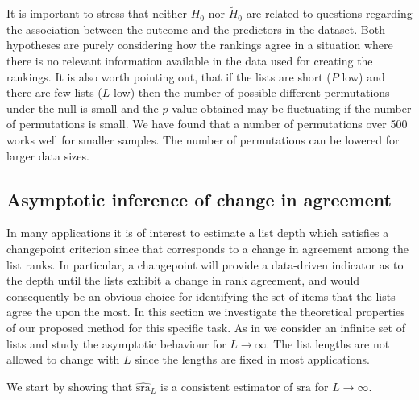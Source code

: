 \documentclass[oupdraft]{bio}
\newcommand{\added}[1]{{\color{added}{}#1}}
\DeclareMathOperator{\E}{\mathbb{E}}
\begin{document}
\added{It is important to stress that neither $H_0$ nor
  $\widetilde H_0$ are related to questions regarding the association
  between the outcome and the predictors in the dataset. Both
  hypotheses are purely considering how the rankings agree in a
  situation where there is no relevant information available in the
  data used for creating the rankings. It is also worth pointing out,
  that if the lists are short ($P$ low) and there are few lists ($L$
  low) then the number of possible different permutations under the
  null is small and the $p$ value obtained may be fluctuating if the
  number of permutations is small. We have found that a number of
  permutations over 500 works well for smaller samples. The number of
  permutations can be lowered for larger data sizes.}


\subsection{Asymptotic inference of change in agreement}\label{sec:chgpoint}
In many applications it is of interest to estimate a list depth which
satisfies a changepoint criterion since that corresponds to a change
in agreement among the list ranks. \added{In particular, a changepoint
  will provide a data-driven indicator as to the depth until the lists
  exhibit a change in rank agreement, and would consequently be an
  obvious choice for identifying the set of items that the lists agree
  the upon the most}. In this section we investigate the theoretical
properties of our proposed method for this specific task. As in
\citet{hall:schi:2012} we consider an infinite set of lists and study
the asymptotic behaviour for $L\to\infty$. The list lengths are not
allowed to change with $L$ since the lengths are fixed in most
applications.

We start by showing that $\widehat{\textrm{sra}}_L$ is a consistent
estimator of $\textrm{sra}$ for $L \rightarrow \infty$.

\end{document}
